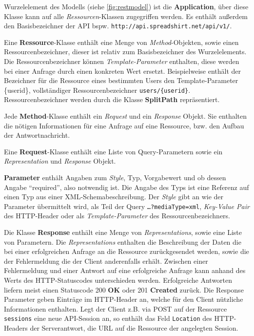 Wurzelelement des Modells (siehe \cref{fig:restmodel}) ist die \textbf{Application}, über diese Klasse kann auf alle \emph{Ressourcen}-Klassen zugegriffen werden. Es enthält außerdem den Basisbezeichner der API bspw. \texttt{http://api.spreadshirt.net/api/v1/}. 

Eine \textbf{Ressource}-Klasse enthält eine Menge von \emph{Method}-Objekten, sowie einen Ressourcenbezeichner, dieser ist relativ zum Basisbezeichner des Wurzelelements. Die Ressourcenbezeichner können \emph{Template-Parameter} enthalten, diese werden bei einer Anfrage durch einen konkreten Wert ersetzt. Beispielweise enthält der Bezeichner für die Ressource eines bestimmten Users den Template-Parameter \{userid\}, vollständiger Ressourcenbezeichner \texttt{users/\{userid\}}. Ressourcenbezeichner werden durch die Klasse \textbf{SplitPath} repräsentiert. 

Jede \textbf{Method}-Klasse enthält ein \emph{Request} und ein \emph{Response} Objekt. Sie enthalten die nötigen Informationen für eine Anfrage auf eine Ressource, bzw. den Aufbau der Antwortnachricht.

Eine \textbf{Request}-Klasse enthält eine Liste von Query-Parametern sowie ein \emph{Representation} und \emph{Response} Objekt.

\textbf{Parameter} enthält Angaben zum \emph{Style}, Typ, Vorgabewert und ob dessen Angabe \enquote{required}, also notwendig ist. Die Angabe des Typs ist eine Referenz auf einen Typ aus einer XML-Schemabeschreibung. Der \emph{Style} gibt an wie der Parameter übermittelt wird, als Teil der Query \texttt{\ldots{}?mediaType=xml}, \emph{Key-Value Pair} des HTTP-Header oder als \emph{Template-Parameter} des Ressourcenbezeichners. 

Die Klasse \textbf{Response} enthält eine Menge von \emph{Representations}, sowie eine Liste von Parametern. Die \emph{Representations} enthalten die Beschreibung der Daten die bei einer erfolgreichen Anfrage an die Ressource zurückgesendet werden, sowie die der Fehlermeldung die der Client anderenfalls erhält. Zwischen einer Fehlermeldung und einer Antwort auf eine erfolgreiche Anfrage kann anhand des Werts des HTTP-Statuscodes unterschieden werden. Erfolgreiche Antworten liefern meist einen Statuscode 200 \textbf{OK} oder 201 \textbf{Created} zurück. Die Response Parameter geben Einträge im HTTP-Header an, welche für den Client nützliche Informationen enthalten. Legt der Client z.B. via POST auf der Ressource \texttt{sessions} eine neue API-Session an, so enthält das Feld \texttt{Location} des HTTP-Headers der Serverantwort, die URL auf die Ressource der angelegten Session.

